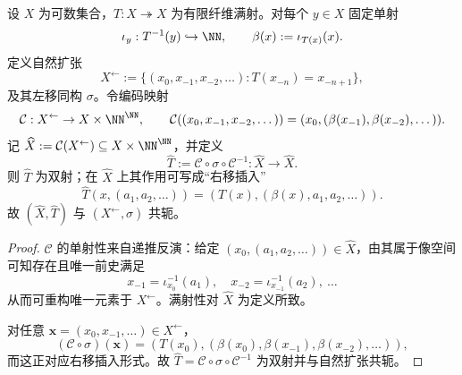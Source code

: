 \begin{theorem}[有限纤维自映射的自然扩张与分支指标寄存器实现]\label{thm:killo-natural-extension-branch-register}
设 \(X\) 为可数集合，\(T:X\twoheadrightarrow X\) 为有限纤维满射。对每个 \(y\in X\) 固定单射
\[
\iota_y:T^{-1}(y)\hookrightarrow\NN,\qquad
\beta(x):=\iota_{T(x)}(x).
\]
定义自然扩张
\[
X^{\leftarrow}:=\{(x_0,x_{-1},x_{-2},\dots):T(x_{-n})=x_{-n+1}\},
\]
及其左移同构 \(\sigma\)。令编码映射
\[
\mathcal C:X^{\leftarrow}\to X\times\NN^\NN,\qquad
\mathcal C((x_0,x_{-1},x_{-2},\dots))=(x_0,(\beta(x_{-1}),\beta(x_{-2}),\dots)).
\]
记 \(\widehat X:=\mathcal C(X^{\leftarrow})\subseteq X\times\NN^\NN\)，并定义
\[
\widehat T:=\mathcal C\circ \sigma\circ \mathcal C^{-1}:\widehat X\to\widehat X.
\]
则 \(\widehat T\) 为双射；在 \(\widehat X\) 上其作用可写成“右移插入”
\[
\widehat T(x,(a_1,a_2,\dots))=(T(x),(\beta(x),a_1,a_2,\dots)).
\]
故 \((\widehat X,\widehat T)\) 与 \((X^{\leftarrow},\sigma)\) 共轭。
\end{theorem}
\begin{proof}
\(\mathcal C\) 的单射性来自递推反演：给定 \((x_0,(a_1,a_2,\dots))\in\widehat X\)，由其属于像空间可知存在且唯一前史满足
\[
x_{-1}=\iota_{x_0}^{-1}(a_1),\quad
x_{-2}=\iota_{x_{-1}}^{-1}(a_2),\ \dots
\]
从而可重构唯一元素于 \(X^{\leftarrow}\)。满射性对 \(\widehat X\) 为定义所致。

对任意 \(\mathbf x=(x_0,x_{-1},\dots)\in X^{\leftarrow}\)，
\[
(\mathcal C\circ \sigma)(\mathbf x)
=(T(x_0),(\beta(x_0),\beta(x_{-1}),\beta(x_{-2}),\dots)),
\]
而这正对应右移插入形式。故 \(\widehat T=\mathcal C\circ\sigma\circ\mathcal C^{-1}\) 为双射并与自然扩张共轭。
\end{proof}

